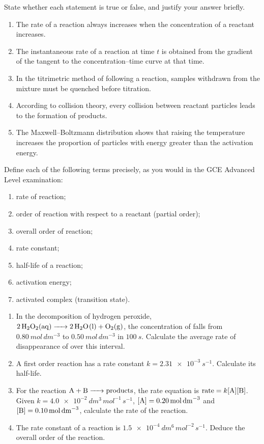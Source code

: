 \documentclass[11pt]{article}
\begin{document}
\begin{exercice}
State whether each statement is true or false, and justify your answer briefly.
\begin{enumerate}
\item The rate of a reaction always increases when the concentration of a reactant increases.
\item The instantaneous rate of a reaction at time $t$ is obtained from the gradient of the tangent to the concentration--time curve at that time.
\item In the titrimetric method of following a reaction, samples withdrawn from the mixture must be quenched before titration.
\item According to collision theory, every collision between reactant particles leads to the formation of products.
\item The Maxwell--Boltzmann distribution shows that raising the temperature increases the proportion of particles with energy greater than the activation energy.
\end{enumerate}
\end{exercice}

\begin{exercice}[Definitions]
Define each of the following terms precisely, as you would in the GCE Advanced Level examination:
\begin{enumerate}
\item rate of reaction;
\item order of reaction with respect to a reactant (partial order);
\item overall order of reaction;
\item rate constant;
\item half-life of a reaction;
\item activation energy;
\item activated complex (transition state).
\end{enumerate}
\end{exercice}

\begin{exercice}
\begin{enumerate}
\item In the decomposition of hydrogen peroxide, $\ce{2H2O2(aq) -> 2H2O(l) + O2(g)}$, the concentration of  falls from $\SI{0.80}{mol\,dm^{-3}}$ to $\SI{0.50}{mol\,dm^{-3}}$ in $\SI{100}{s}$. Calculate the average rate of disappearance of  over this interval.
\item A first order reaction has a rate constant $k = \SI{2.31e-3}{s^{-1}}$. Calculate its half-life.
\item For the reaction $\ce{A + B -> products}$, the rate equation is $\text{rate} = k[\ce{A}][\ce{B}]$. Given $k = \SI{4.0e-2}{dm^{3}\,mol^{-1}\,s^{-1}}$, $[\ce{A}] = \SI{0.20}{mol\,dm^{-3}}$ and $[\ce{B}] = \SI{0.10}{mol\,dm^{-3}}$, calculate the rate of the reaction.
\item The rate constant of a reaction is $\SI{1.5e-4}{dm^{6}\,mol^{-2}\,s^{-1}}$. Deduce the overall order of the reaction.
\end{enumerate}
\end{exercice}
\end{document}
